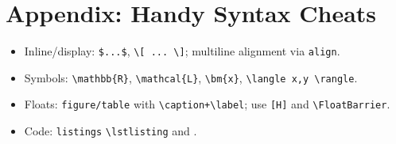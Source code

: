 \documentclass[11pt]{article}
\begin{document}
\appendix
\section{Appendix: Handy Syntax Cheats}
\begin{itemize}
  \item Inline/display: \verb|$...$|, \verb|\[ ... \]|; multiline alignment via \verb|align|.
  \item Symbols: \verb|\mathbb{R}|, \verb|\mathcal{L}|, \verb|\bm{x}|, \verb|\langle x,y \rangle|.
  \item Floats: \verb|figure/table| with \verb|\caption+\label|; use \verb|[H]| and \verb|\FloatBarrier|.
  \item Code: \verb|listings| \verb|\lstlisting| and \verb||.
\end{itemize}
\end{document}
